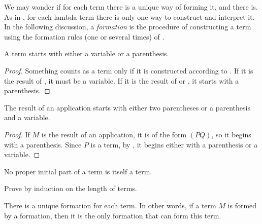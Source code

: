 \documentclass[../../../include/open-logic-section]{subfiles}
\begin{document}

We may wonder if for each term there is a unique way of forming it,
and there is.  As in , for each lambda term
there is only one way to construct and interpret it.  In the following
discussion, a \emph{formation} is the procedure of constructing a term
using the formation rules (one or several times) of
.

\begin{lem}
A term starts with either a variable or a parenthesis.
\end{lem}

\begin{proof}
Something counts as a term only if it is constructed according to
. If it is the result of
, it must be a variable. If it is the result
of  or , it starts
with a parenthesis.
\end{proof}

\begin{lem}
The result of an application starts with either two parentheses or a
parenthesis and a variable.
\end{lem}

\begin{proof}
If $M$ is the result of an application, it is of the form $(PQ)$, so
it begins with a parenthesis. Since $P$ is a term, by
, it begins either with a parenthesis or a
variable.
\end{proof}

\begin{lem}
No proper initial part of a term is itself a term.
\end{lem}

\begin{prob}
Prove  by induction on the length
of terms.
\end{prob}

\begin{prop} 
There is a unique formation for each term. In other words, if a term
$M$ is formed by a formation, then it is the only formation that can
form this term.
\end{prop}
\end{document}
